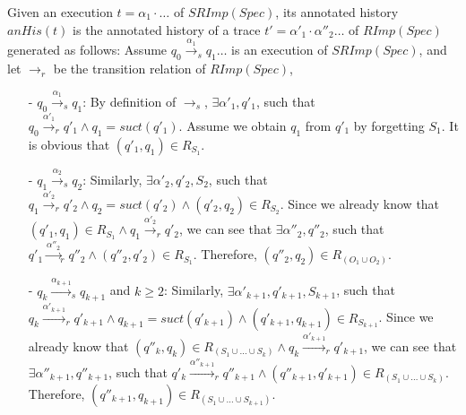 Given an execution $t = \alpha_1 \cdot \ldots$ of $SRImp(Spec)$, its annotated history $anHis(t)$ is the annotated history of a trace $t' = \alpha'_1 \cdot \alpha''_2 \ldots$ of $RImp(Spec)$ generated as follows: Assume $q_0 {\xrightarrow{\alpha_1}}_s q_1 \ldots$ is an execution of $SRImp(Spec)$, and let $\rightarrow_r$ be the transition relation of $RImp(Spec)$,

\begin{itemize}
\setlength{\itemsep}{0.5pt}
\item[-] $q_0 {\xrightarrow{\alpha_1}}_s q_1$: By definition of $\rightarrow_s$, $\exists \alpha'_1, q'_1$, such that $q_0 {\xrightarrow{\alpha'_1}}_r q'_1 \wedge q_1 = suct(q'_1)$. Assume we obtain $q_1$ from $q'_1$ by forgetting $S_1$. It is obvious that $(q'_1,q_1) \in R_{S_1}$.

\item[-] $q_1 {\xrightarrow{\alpha_2}}_s q_2$: Similarly, $\exists \alpha'_2, q'_2, S_2$, such that $q_1 {\xrightarrow{\alpha'_2}}_r q'_2 \wedge q_2 = suct(q'_2) \wedge (q'_2,q_2) \in R_{S_2}$. Since we already know that $(q'_1,q_1) \in R_{S_1} \wedge q_1 {\xrightarrow{\alpha'_2}}_r q'_2$, we can see that $\exists \alpha''_2,q''_2$, such that $q'_1 {\xrightarrow{\alpha''_2}}_r q''_2 \wedge (q''_2,q'_2) \in R_{S_1}$. Therefore, $(q''_2,q_2) \in R_{( O_1 \cup O_2)}$.

\item[-] $q_k {\xrightarrow{\alpha_{\mathit{k+1}}}}_s q_{\mathit{k+1}}$ and $k \geq 2$: Similarly, $\exists \alpha'_{\mathit{k+1}}, q'_{\mathit{k+1}}, S_{\mathit{k+1}}$, such that $q_k {\xrightarrow{\alpha'_{\mathit{k+1}}}}_r q'_{\mathit{k+1}} \wedge q_{\mathit{k+1}} = suct(q'_{\mathit{k+1}}) \wedge (q'_{\mathit{k+1}},q_{\mathit{k+1}}) \in R_{S_{\mathit{k+1}}}$. Since we already know that $(q''_k,q_k) \in R_{( S_1 \cup \ldots \cup S_k )} \wedge q_k {\xrightarrow{\alpha'_\mathit{k+1}}}_r q'_{\mathit{k+1}}$, we can see that $\exists \alpha''_{\mathit{k+1}} ,q''_{\mathit{k+1}} $, such that $q'_k {\xrightarrow{\alpha''_{\mathit{k+1}} }}_r q''_{\mathit{k+1}}  \wedge (q''_{\mathit{k+1}} ,q'_{\mathit{k+1}} ) \in R_{( S_1 \cup \ldots \cup S_k )}$. Therefore, $(q''_{\mathit{k+1}} ,q_{\mathit{k+1}} ) \in R_{( S_1 \cup \ldots \cup S_{\mathit{k+1}}  )}$.
\end{itemize}


